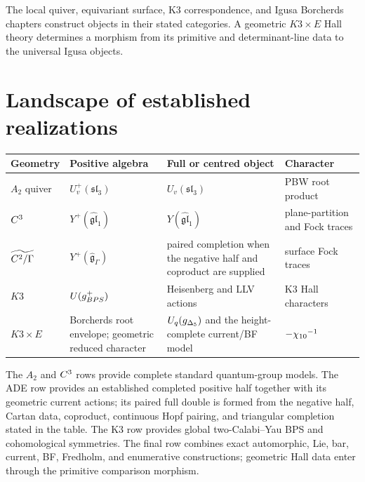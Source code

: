 The local quiver, equivariant surface, K3 correspondence, and Igusa Borcherds chapters construct objects in their stated categories.  A geometric $K3\times E$ Hall theory determines a morphism from its primitive and determinant-line data to the universal Igusa objects.

\chapter{Landscape of established realizations}
\begin{center}
\footnotesize
\begin{tabularx}{0.99\textwidth}{@{}>{\raggedright\arraybackslash}p{}>{\raggedright\arraybackslash}p{}>{\raggedright\arraybackslash}X>{\raggedright\arraybackslash}p{}@{}}
\toprule
\textbf{Geometry}&\textbf{Positive algebra}&\textbf{Full or centred object}&\textbf{Character}\\
\midrule
$A_2$ quiver&$U_v^+(\mathfrak{sl}_3)$&$U_v(\mathfrak{sl}_3)$&PBW root product\\
$C^3$&$Y^+(\widehat{\mathfrak{gl}}_1)$&$Y(\widehat{\mathfrak{gl}}_1)$&plane-partition and Fock traces\\
$\widetilde{C^2/\Gamma}$&$Y^+(\widehat{\mathfrak g}_\Gamma)$&paired completion when the negative half and coproduct are supplied&surface Fock traces\\
$K3$&$U(g_{BPS}^+)$&Heisenberg and LLV actions&K3 Hall characters\\
$K3\times E$&Borcherds root envelope; geometric reduced character&$U_q({g_{\Delta_5}})$ and the height-complete current/BF model&$-{\chi_{10}}^{-1}$\\
\bottomrule
\end{tabularx}
\end{center}
The $A_2$ and $C^3$ rows provide complete standard quantum-group models. The ADE row provides an established completed positive half together with its geometric current actions; its paired full double is formed from the negative half, Cartan data, coproduct, continuous Hopf pairing, and triangular completion stated in the table. The K3 row provides global two-Calabi--Yau BPS and cohomological symmetries. The final row combines exact automorphic, Lie, bar, current, BF, Fredholm, and enumerative constructions; geometric Hall data enter through the primitive comparison morphism.

